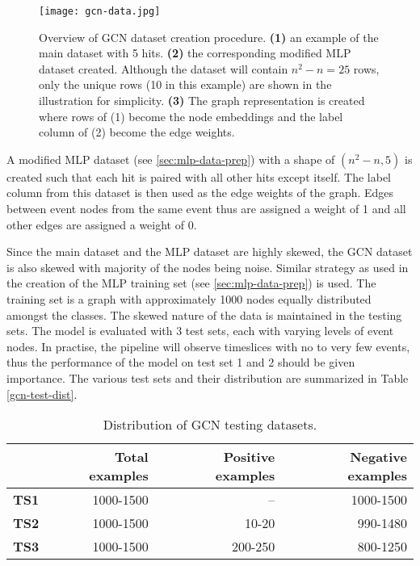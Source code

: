 \begin{figure}[htb]
  \centering
  \texttt{[image: gcn-data.jpg]}
  \caption{Overview of GCN dataset creation procedure. \textbf{(1)} an
    example of the main dataset with 5 hits. \textbf{(2)} the
    corresponding modified MLP dataset created. Although the dataset
    will contain $n^{2}-n = 25$ rows, only the unique rows (10 in this
    example) are shown in the illustration for simplicity.
    \textbf{(3)} The graph representation is created where rows of (1)
    become the node embeddings and the label column of (2) become the
    edge weights.}
  \label{fig:gcn-data}
\end{figure}

A modified MLP dataset (see \ref{sec:mlp-data-prep}) with a shape of
\texttt{$(n^{2}-n, 5)$} is created such that each hit is paired with
all other hits except itself. The label column from this dataset is
then used as the edge weights of the graph. Edges between event nodes
from the same event thus are assigned a weight of 1 and all other
edges are assigned a weight of 0.

Since the main dataset and the MLP dataset are highly skewed, the GCN
dataset is also skewed with majority of the nodes being noise. Similar
strategy as used in the creation of the MLP training set (see
\ref{sec:mlp-data-prep}) is used. The training set is a graph with
approximately 1000 nodes equally distributed amongst the classes. The
skewed nature of the data is maintained in the testing sets. The model
is evaluated with 3 test sets, each with varying levels of event
nodes. In practise, the pipeline will observe timeslices with no to
very few events, thus the performance of the model on test set 1 and 2
should be given importance. The various test sets and their
distribution are summarized in Table \ref{gcn-test-dist}.

\begin{table}[htb]
  \centering
  \caption{Distribution of GCN testing datasets.}
  \begin{tabular}{lrrr}
    \hline
    & Total examples & Positive examples & Negative examples \\
    \hline
    \textbf{TS1} & 1000-1500 & -- & 1000-1500 \\
    \textbf{TS2} & 1000-1500 & 10-20 & 990-1480 \\
    \textbf{TS3} & 1000-1500 & 200-250 & 800-1250 \\
    \hline
  \end{tabular}
  \label{tab:gcn-test-dst}
\end{table}

